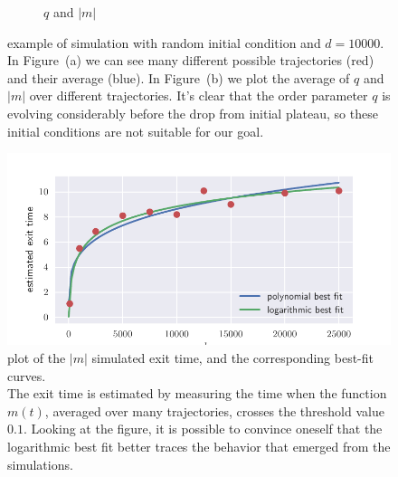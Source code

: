 \begin{figure}
\begin{subfigure}{0.495\textwidth}
    \caption{\(q\) and \(|m|\)}
  \end{subfigure}
  \caption{
    example of simulation with random initial condition and \(d=10000\).\\
    In Figure~(a) we can see many different possible trajectories (red) and their average (blue).
    In Figure~(b) we plot the average of \(q\) and \(|m|\) over different trajectories.
    It's clear that the order parameter \(q\) is evolving considerably before the drop from initial
    plateau, so these initial conditions are not suitable for our goal.
  }
  \label{fig:unconstraned-random-example}
\end{figure}
\begin{figure}
  \centering
  \includegraphics[width=\textwidth]{figures/unconstraned-phase-retrieval-exittimes.pdf}
  \caption{
    plot of the \(|m|\) simulated exit time, and the corresponding best-fit curves.\\
    The exit time is estimated by measuring the time when the function \(m(t)\), averaged over many trajectories,
    crosses the threshold value \(0.1\).
    Looking at the figure, it is possible to convince oneself that 
    the logarithmic best fit better traces the behavior that emerged from the simulations. 
  }
  \label{fig:unconstraned-random-m-exit-time} 
\end{figure}
\FloatBarrier

